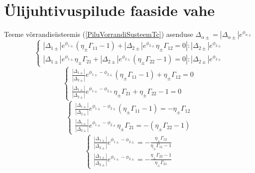 \documentclass[class=article, crop=false]{standalone}
\begin{document}
\section{Ülijuhtivuspilude faaside vahe}
Teeme võrrandisüsteemis (\ref{PiluVorrandiSusteemTc}) asenduse $ \Delta_{ \alpha \pm} = \left| \Delta_{ \alpha \pm} \right| e^{ \phi_{ \alpha \pm}} $
\begin{equation}\label{key}
	\begin{cases}
		\left. \left| \Delta_{ 1 \pm} \right| e^{ \phi_{ 1 \pm}} \left( \eta_{ \pm} \Gamma_{11} - 1 \right) + \left| \Delta_{ 2 \pm} \right| e^{ \phi_{ 2 \pm}} \eta_{ \pm} \Gamma_{12} = 0 \right| : \left| \Delta_{ 2 \pm} \right| e^{ \phi_{ 2 \pm}}\\
		\left. \left| \Delta_{ 1 \pm} \right| e^{ \phi_{ 1 \pm}} \eta_{ \pm} \Gamma_{21} + \left| \Delta_{ 2 \pm} \right| e^{ \phi_{ 2 \pm}} \left( \eta_{ \pm} \Gamma_{22} - 1 \right) = 0 \right| : \left| \Delta_{ 2 \pm} \right| e^{ \phi_{ 2 \pm}}
	\end{cases}
\end{equation}
\begin{equation}\label{key}
	\begin{cases}
		\frac{\left| \Delta_{ 1 \pm} \right|}{ \left| \Delta_{ 2 \pm} \right|} e^{ \phi_{ 1 \pm} - \phi_{ 2 \pm}} \left( \eta_{ \pm} \Gamma_{11} - 1 \right) + \eta_{ \pm} \Gamma_{12} = 0 \\
		\frac{\left| \Delta_{ 1 \pm} \right|}{ \left| \Delta_{ 2 \pm} \right|} e^{ \phi_{ 1 \pm} - \phi_{ 2 \pm}} \eta_{ \pm} \Gamma_{21} + \eta_{ \pm} \Gamma_{22} - 1 = 0
	\end{cases}
\end{equation}
\begin{equation}\label{key}
	\begin{cases}
		\frac{\left| \Delta_{ 1 \pm} \right|}{ \left| \Delta_{ 2 \pm} \right|} e^{ \phi_{ 1 \pm} - \phi_{ 2 \pm}} \left( \eta_{ \pm} \Gamma_{11} - 1 \right) = - \eta_{ \pm} \Gamma_{12} \\
		\frac{\left| \Delta_{ 1 \pm} \right|}{ \left| \Delta_{ 2 \pm} \right|} e^{ \phi_{ 1 \pm} - \phi_{ 2 \pm}} \eta_{ \pm} \Gamma_{21} = - \left( \eta_{ \pm} \Gamma_{22} - 1 \right)
	\end{cases}
\end{equation}
\begin{equation}\label{key}
	\begin{cases}
		\frac{\left| \Delta_{ 1 \pm} \right|}{ \left| \Delta_{ 2 \pm} \right|} e^{ \phi_{ 1 \pm} - \phi_{ 2 \pm}} = - \frac{ \eta_{ \pm} \Gamma_{12}}{ \eta_{ \pm} \Gamma_{11} - 1} \\
		\frac{\left| \Delta_{ 1 \pm} \right|}{ \left| \Delta_{ 2 \pm} \right|} e^{ \phi_{ 1 \pm} - \phi_{ 2 \pm}} = - \frac{ \eta_{ \pm} \Gamma_{22} - 1}{ \eta_{ \pm} \Gamma_{21}}
	\end{cases}
\end{equation}
\end{document}

